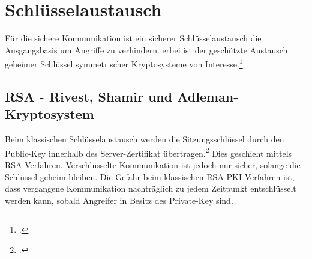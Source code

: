 \documentclass  [paper=a4,
				fontsize=12pt,
				listof=totoc,
				bibliography=totoc
				]{scrreprt}
\begin{document}
		\section{Schlüsselaustausch}
			Für die sichere Kommunikation ist ein sicherer Schlüsselaustausch die Ausgangsbasis um Angriffe zu verhindern. \glqq erbei ist der geschützte Austausch geheimer Schlüssel symmetrischer Kryptosysteme von Interesse.\grqq\footcite[Vgl.][S. 437]{Eckert2013}
			\subsection{RSA - Rivest, Shamir und Adleman-Kryptosystem} 
				Beim klassischen Schlüsselaustausch werden die Sitzungsschlüssel durch den Public-Key innerhalb des Server-Zertifikat übertragen.\footcite[Vgl.][]{Boeck2013} Dies geschieht mittels \ac{RSA}-Verfahren. Verschlüsselte Kommunikation ist jedoch nur sicher, solange die Schlüssel geheim bleiben. Die Gefahr beim klassischen \ac{RSA}-\ac{PKI}-Verfahren ist, dass vergangene Kommunikation nachträglich zu jedem Zeitpunkt entschlüsselt werden kann, sobald Angreifer in Besitz des Private-Key sind.\medskip\\
\end{document}
